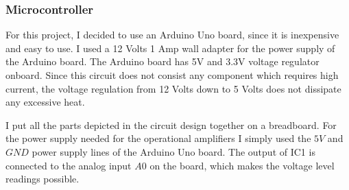 \subsubsection{Microcontroller}
For this project, I decided to use an Arduino Uno board, since it is inexpensive and easy to use. I used a 12 Volts 1 Amp wall adapter for the power supply of the Arduino board. The Arduino board has 5V and 3.3V voltage regulator onboard. Since this circuit does not consist any component which requires high current, the voltage regulation from 12 Volts down to 5 Volts does not dissipate any excessive heat. \par
I put all the parts depicted in the circuit design together on a breadboard. For the power supply needed for the operational amplifiers I simply used the $5V$ and $GND$ power supply lines of the Arduino Uno board. The output of IC1 is connected to the analog input $A0$ on the board, which makes the voltage level readings possible. 



